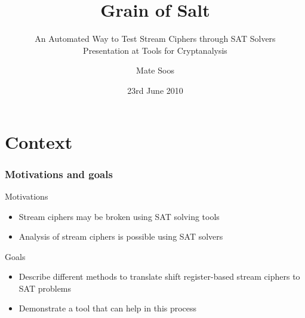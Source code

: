 \documentclass[xcolor=usenames,xcolor=svgnames,table,slidestop,compress,mathserif]{beamer}
\title[Grain of Salt]{Grain of Salt
}
\subtitle{An Automated Way to Test
Stream Ciphers through SAT Solvers\\\tiny Presentation at Tools for Cryptanalysis}
\author{\sc Mate Soos}
\institute{Paris LIP6, SALSA Team}
\date{23rd June 2010}
\begin{document}
\begin{frame}
  \titlepage
\end{frame}

\setcounter{tocdepth}{2}

\section{Context}

\frame
{
\frametitle{Motivations and goals}
\begin{beamerboxesrounded}[shadow=true]{Motivations}
   \begin{itemize}
    \item Stream ciphers may be broken using SAT solving tools
    \item Analysis of stream ciphers is possible using SAT solvers
   \end{itemize}
\end{beamerboxesrounded}

\bigskip
\begin{beamerboxesrounded}[shadow=true]{Goals}
   \begin{itemize}
    \item Describe different methods to translate shift register-based stream ciphers to SAT problems
    \item Demonstrate a tool that can help in this process
   \end{itemize}
\end{beamerboxesrounded}
}
\end{document}
